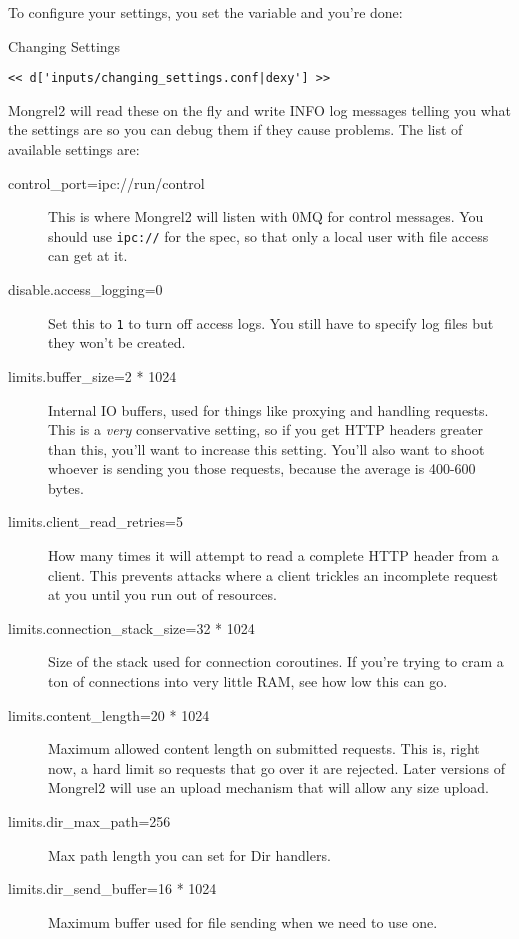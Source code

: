 To configure your settings, you set the variable  and you're done:

\begin{code}{Changing Settings}
\begin{lstlisting}
<< d['inputs/changing_settings.conf|dexy'] >>
\end{lstlisting}
\end{code}

Mongrel2 will read these on the fly and write INFO log messages telling you
what the settings are so you can debug them if they cause problems.  The list
of available settings are:

\begin{description}
\item[control\_port=ipc://run/control] This is where Mongrel2 will listen with 0MQ for control messages.  You should use \verb|ipc://| for the spec, so that only a local user with file access can get at it.
\item[disable.access\_logging=0] Set this to \verb|1| to turn off access logs. You still have to specify log files but they won't be created.
\item[limits.buffer\_size=2 * 1024] Internal IO buffers, used for things like proxying and handling requests.  This is a \emph{very} conservative setting, so if you get HTTP headers greater than this, you'll want to increase this setting.  You'll also want to shoot whoever is sending you those requests, because the average is 400-600 bytes.
\item[limits.client\_read\_retries=5] How many times it will attempt to read a complete HTTP header from a client. This prevents attacks where a client trickles an incomplete request at you until you run out of resources.
\item[limits.connection\_stack\_size=32 * 1024] Size of the stack used for connection coroutines.  If you're trying to cram a ton of connections into very little RAM, see how low this can go.
\item[limits.content\_length=20 * 1024] Maximum allowed content length on submitted requests.  This is, right now, a hard limit so requests that go over it are rejected.  Later versions of Mongrel2 will use an upload mechanism that will allow any size upload.
\item[limits.dir\_max\_path=256] Max path length you can set for Dir handlers.
\item[limits.dir\_send\_buffer=16 * 1024] Maximum buffer used for file sending when we need to use one.

\end{description}
